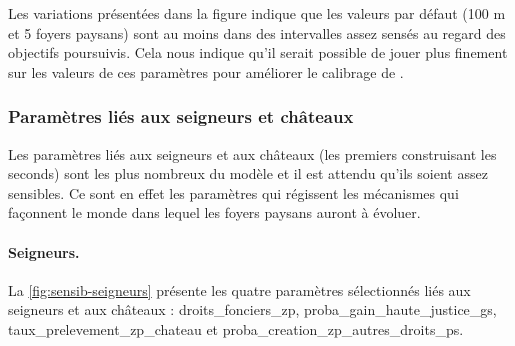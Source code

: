 Les variations présentées dans la figure indique que les valeurs par défaut (100 m et 5 foyers paysans) sont au moins dans des intervalles assez sensés au regard des objectifs poursuivis.
Cela nous indique qu'il serait possible de jouer plus finement sur les valeurs de ces paramètres pour améliorer le calibrage de \simfeodal{}.

\subsubsection{Paramètres liés aux seigneurs et châteaux}

Les paramètres liés aux seigneurs et aux châteaux (les premiers construisant les seconds) sont les plus nombreux du modèle et il est attendu qu'ils soient assez sensibles.
Ce sont en effet les paramètres qui régissent les mécanismes qui façonnent le monde dans lequel les foyers paysans auront à évoluer.

\paragraph{Seigneurs.}

La \cref{fig:sensib-seigneurs} présente les quatre paramètres sélectionnés liés aux seigneurs et aux châteaux :
\textsf{droits\_fonciers\_zp}, \textsf{proba\_gain\_haute\_justice\_gs}, \textsf{taux\_prelevement\_zp\_chateau} et \textsf{proba\_creation\_zp\_autres\_droits\_ps}.

